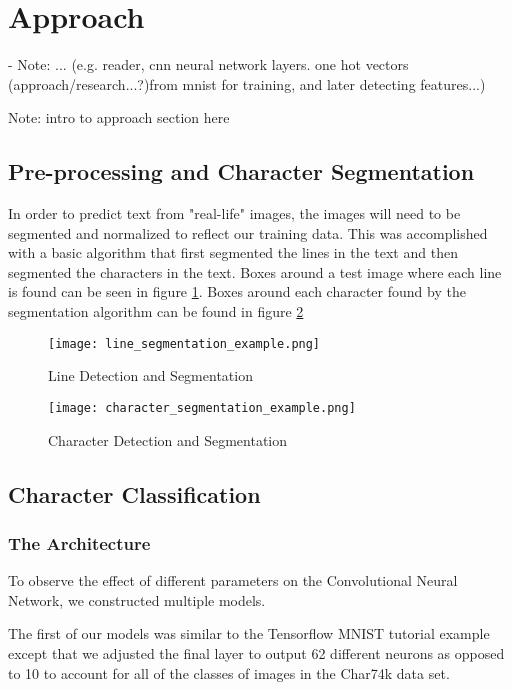 \documentclass[11pt]{article}
\begin{document}
\section{Approach}
    - Note: ... (e.g. reader, cnn neural network layers.  one hot vectors (approach/research...?)from mnist for training, and later detecting features...)

    Note: intro to approach section here

\subsection{Pre-processing and Character Segmentation}
    
    In order to predict text from "real-life" images, the images will need to be segmented and normalized to reflect our training data. This was accomplished with a basic algorithm that first segmented the lines in the text and then segmented the characters in the text. Boxes around a test image where each line is found can be seen in figure \ref{fig:line_segmentation}. Boxes around each character found by the segmentation algorithm can be found in figure \ref{fig:character_segmentation}
    
    \begin{figure}
        \centering
        \texttt{[image: line\_segmentation\_example.png]}
        \caption{Line Detection and Segmentation}
        \label{fig:line_segmentation}
    \end{figure}
    
    \begin{figure}
        \centering
        \texttt{[image: character\_segmentation\_example.png]}
        \caption{Character Detection and Segmentation}
        \label{fig:character_segmentation}
    \end{figure}

\subsection{Character Classification}

\subsubsection{The Architecture}
    To observe the effect of different parameters on the Convolutional Neural Network, we constructed multiple models.

    The first of our models was similar to the Tensorflow MNIST tutorial example except that we adjusted the final layer to output 62 different neurons as opposed to 10 to account for all of the classes of images in the Char74k data set.
    
\end{document}
